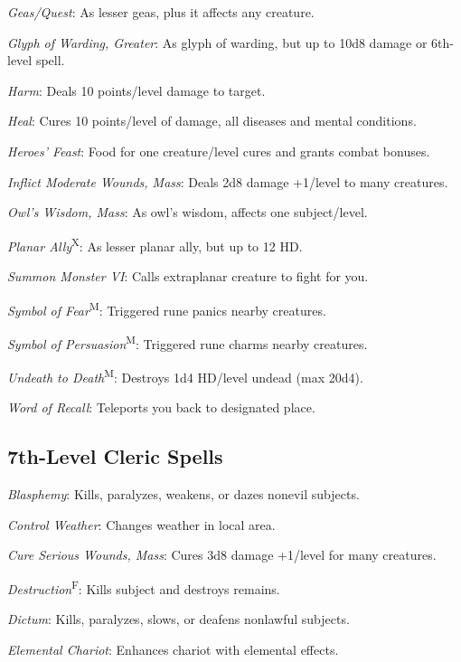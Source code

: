 \textit{Geas/Quest}: As lesser geas, plus it affects any creature.

\textit{Glyph of Warding, Greater}: As glyph of warding, but up to 10d8 damage or 6th-level spell.

\textit{Harm}: Deals 10 points/level damage to target.

\textit{Heal}: Cures 10 points/level of damage, all diseases and mental conditions.

\textit{Heroes' Feast}: Food for one creature/level cures and grants combat bonuses.

\textit{Inflict Moderate Wounds, Mass}: Deals 2d8 damage +1/level to many creatures.

\textit{Owl's Wisdom, Mass}: As owl's wisdom, affects one subject/level.

\textit{Planar Ally}\textsuperscript{X}: As lesser planar ally, but up to 12 HD.

\textit{Summon Monster VI}: Calls extraplanar creature to fight for you.

\textit{Symbol of Fear}\textsuperscript{M}: Triggered rune panics nearby creatures.

\textit{Symbol of Persuasion}\textsuperscript{M}: Triggered rune charms nearby creatures.

\textit{Undeath to Death}\textsuperscript{M}: Destroys 1d4 HD/level undead (max 20d4).


\textit{Word of Recall}: Teleports you back to designated place.



\subsection{7th-Level Cleric Spells}

\textit{Blasphemy}: Kills, paralyzes, weakens, or dazes nonevil subjects.

\textit{Control Weather}: Changes weather in local area.

\textit{Cure Serious Wounds, Mass}: Cures 3d8 damage +1/level for many creatures.

\textit{Destruction}\textsuperscript{F}: Kills subject and destroys remains.

\textit{Dictum}: Kills, paralyzes, slows, or deafens nonlawful subjects.

\textit{Elemental Chariot}: Enhances chariot with elemental effects.

